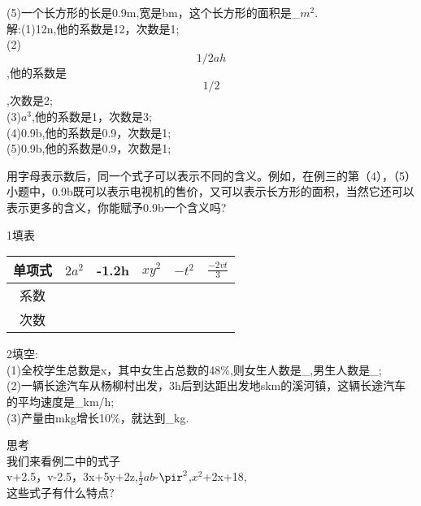 \documentclass{ctexart}
\begin{document}
\begin{article}

\begin{example}
(5)一个长方形的长是0.9m,宽是bm，这个长方形的面积是_$m^{2}$.\\
解:(1)12n,他的系数是12，次数是1;\\
(2)$$1/2ah$$,他的系数是$$1/2$$,次数是2;\\
(3)$a^{3}$,他的系数是1，次数是3;\\
(4)0.9b,他的系数是0.9，次数是1;\\
(5)0.9b,他的系数是0.9，次数是1;\\

\end{example}
用字母表示数后，同一个式子可以表示不同的含义。例如，在例三的第（4），（5）小题中，0.9b既可以表示电视机的售价，又可以表示长方形的面积，当然它还可以表示更多的含义，你能赋予0.9b一个含义吗?\\
\begin{ex}
1填表\\
\begin{tabular}{|c|c|c|c|c|c|}
\hline  %
单项式&$2a^{2}$&-1.2h& $xy^{2}$& $-t^{2}$&$\frac{-2vt}{3}$\\
\hline
系数&&&&&\\
\hline
次数&&&&&\\
\hline
  \end{tabular}
2填空:\\
(1)全校学生总数是x，其中女生占总数的48$\%$,则女生人数是\_,男生人数是\_;\\
(2)一辆长途汽车从杨柳村出发，3h后到达距出发地skm的溪河镇，这辆长途汽车的平均速度是\_km/h;\\
(3)产量由mkg增长10$\%$，就达到\_kg.\\

\end{ex}
思考\\
我们来看例二中的式子\\
v+2.5，v-2.5，3x+5y+2z,$\frac{1}{2}ab$-$\pir^{2}$,$x^{2}$+2x+18,\\
这些式子有什么特点?\\
\end{article}
\end{document}
